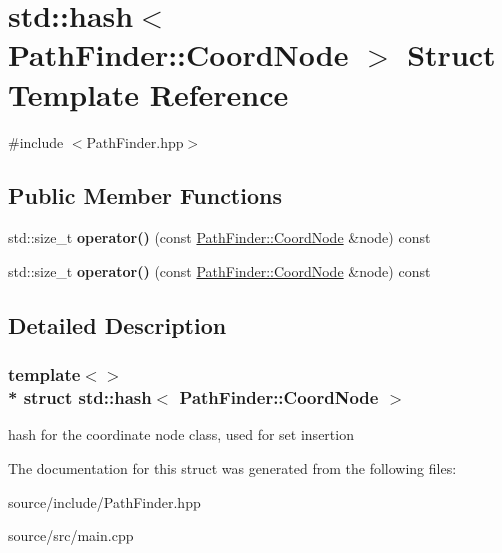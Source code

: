 \hypertarget{structstd_1_1hash_3_01_path_finder_1_1_coord_node_01_4}{}\section{std\+:\+:hash$<$ Path\+Finder\+:\+:Coord\+Node $>$ Struct Template Reference}
\label{structstd_1_1hash_3_01_path_finder_1_1_coord_node_01_4}


{\ttfamily \#include $<$Path\+Finder.\+hpp$>$}

\subsection*{Public Member Functions}
\begin{DoxyCompactItemize}
\item 
std\+::size\+\_\+t {\bfseries operator()} (const \hyperlink{class_path_finder_1_1_coord_node}{Path\+Finder\+::\+Coord\+Node} \&node) const \hypertarget{structstd_1_1hash_3_01_path_finder_1_1_coord_node_01_4_ac4d8fe0f857941c8609d92fb08cdcb22}{}\label{structstd_1_1hash_3_01_path_finder_1_1_coord_node_01_4_ac4d8fe0f857941c8609d92fb08cdcb22}

\item 
std\+::size\+\_\+t {\bfseries operator()} (const \hyperlink{class_path_finder_1_1_coord_node}{Path\+Finder\+::\+Coord\+Node} \&node) const \hypertarget{structstd_1_1hash_3_01_path_finder_1_1_coord_node_01_4_ac4d8fe0f857941c8609d92fb08cdcb22}{}\label{structstd_1_1hash_3_01_path_finder_1_1_coord_node_01_4_ac4d8fe0f857941c8609d92fb08cdcb22}

\end{DoxyCompactItemize}


\subsection{Detailed Description}
\subsubsection*{template$<$$>$\\*
struct std\+::hash$<$ Path\+Finder\+::\+Coord\+Node $>$}

hash for the coordinate node class, used for set insertion 

The documentation for this struct was generated from the following files\+:\begin{DoxyCompactItemize}
\item 
source/include/Path\+Finder.\+hpp\item 
source/src/main.\+cpp\end{DoxyCompactItemize}
